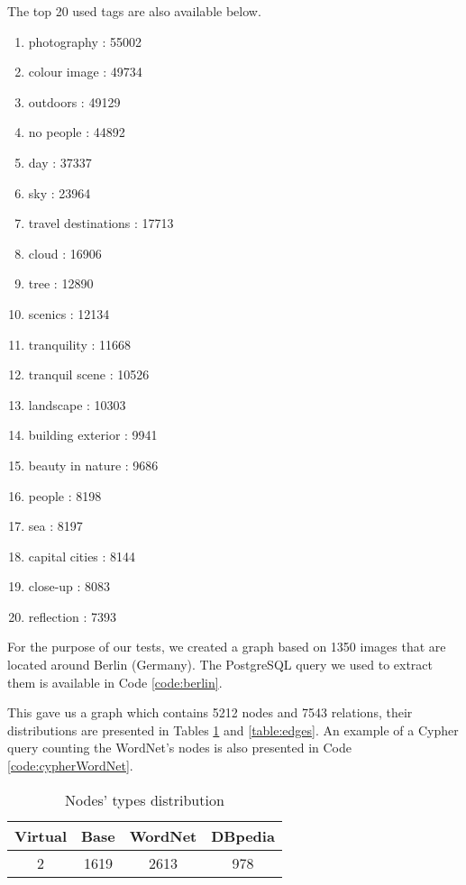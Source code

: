 The top 20 used tags are also available below.
\begin{multicols}{2}
\begin{enumerate}
  \item photography : 55002
  \item colour image : 49734
  \item outdoors : 49129
  \item no people : 44892
  \item day : 37337
  \item sky : 23964
  \item travel destinations : 17713
  \item cloud : 16906
  \item tree : 12890
  \item scenics : 12134
  \item tranquility : 11668
  \item tranquil scene : 10526
  \item landscape : 10303
  \item building exterior : 9941
  \item beauty in nature : 9686
  \item people : 8198
  \item sea : 8197
  \item capital cities : 8144
  \item close-up : 8083
  \item reflection : 7393
\end{enumerate}
\end{multicols}

For the purpose of our tests, we created a graph based on 1350 images that are located around Berlin (Germany). The PostgreSQL query we used to extract them is available in Code \ref{code:berlin}.


This gave us a graph which contains 5212 nodes and 7543 relations, their distributions are presented in Tables \ref{table:nodes} and \ref{table:edges}. An example of a Cypher query counting the WordNet's nodes is also presented in Code \ref{code:cypherWordNet}.\\

\begin{table}[!h]
\centering
\begin{tabular}{|c|c|c|c|}
\hline
{\bf Virtual} & {\bf Base} & {\bf WordNet} & {\bf DBpedia} \\ \hline
2             & 1619       & 2613          & 978           \\ \hline
\end{tabular}
\caption{Nodes' types distribution}
\label{table:nodes}
\end{table}


